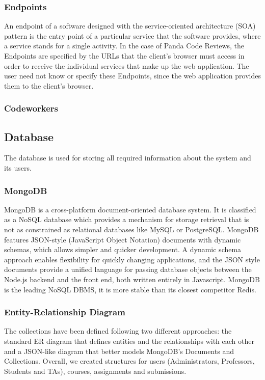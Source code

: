 \subsubsection{Endpoints}

An endpoint of a software designed with the service-oriented architecture (SOA)
pattern is the entry point of a particular service that the software provides,
where a service stands for a single activity. In the case of Panda Code Reviews,
the Endpoints are specified by the URLs that the client's browser must access in
order to receive the individual services that make up the web application. The
user need not know or specify these Endpoints, since the web application
provides them to the client's browser.

\subsubsection{Codeworkers}

\subsection{Database}

The database is used for storing all required information about the system and
its users.

\subsubsection{MongoDB}

MongoDB is a cross-platform document-oriented database system. It is classified
as a NoSQL database which provides a mechanism for storage retrieval that is not
as constrained as relational databases like MySQL or PostgreSQL. MongoDB
features JSON-style (JavaScript Object Notation) documents with dynamic schemas,
which allows simpler and quicker development. A dynamic schema approach enables
flexibility for quickly changing applications, and the JSON style documents
provide a unified language for passing database objects between the Node.js
backend and the front end, both written entirely in Javascript. MongoDB is the
leading NoSQL DBMS, it is more stable than its closest competitor Redis.

\subsubsection{Entity-Relationship Diagram}

The collections have been defined following two different approaches: the
standard ER diagram that defines entities and the relationships with each other
and a JSON-like diagram that better models MongoDB's Documents and Collections.
Overall, we created structures for users (Administrators, Professors, Students
and TAs), courses, assignments and submissions.

